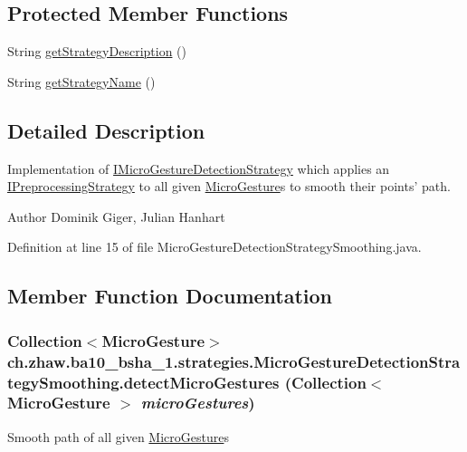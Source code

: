 \subsection*{Protected Member Functions}
\begin{DoxyCompactItemize}
\item 
String \hyperlink{classch_1_1zhaw_1_1ba10__bsha__1_1_1strategies_1_1MicroGestureDetectionStrategySmoothing_a5189e1b6d591f58bbe190f59cd6ad18f}{getStrategyDescription} ()
\item 
String \hyperlink{classch_1_1zhaw_1_1ba10__bsha__1_1_1strategies_1_1MicroGestureDetectionStrategySmoothing_aa12378131b9c311f0191934885c3345a}{getStrategyName} ()
\end{DoxyCompactItemize}


\subsection{Detailed Description}
Implementation of \hyperlink{interfacech_1_1zhaw_1_1ba10__bsha__1_1_1strategies_1_1IMicroGestureDetectionStrategy}{IMicroGestureDetectionStrategy} which applies an \hyperlink{interfacech_1_1zhaw_1_1ba10__bsha__1_1_1strategies_1_1IPreprocessingStrategy}{IPreprocessingStrategy} to all given \hyperlink{}{MicroGesture}s to smooth their points' path.

\begin{DoxyAuthor}{Author}
Dominik Giger, Julian Hanhart 
\end{DoxyAuthor}


Definition at line 15 of file MicroGestureDetectionStrategySmoothing.java.

\subsection{Member Function Documentation}
\hypertarget{classch_1_1zhaw_1_1ba10__bsha__1_1_1strategies_1_1MicroGestureDetectionStrategySmoothing_acdb5b6b2bb7ad9f48c79b88770113f45}{
\subsubsection[{detectMicroGestures}]{\setlength{\rightskip}{0pt plus 5cm}Collection$<${\bf MicroGesture}$>$ ch.zhaw.ba10\_\-bsha\_\-1.strategies.MicroGestureDetectionStrategySmoothing.detectMicroGestures (Collection$<$ {\bf MicroGesture} $>$ {\em microGestures})}}
\label{classch_1_1zhaw_1_1ba10__bsha__1_1_1strategies_1_1MicroGestureDetectionStrategySmoothing_acdb5b6b2bb7ad9f48c79b88770113f45}
Smooth path of all given \hyperlink{}{MicroGesture}s


